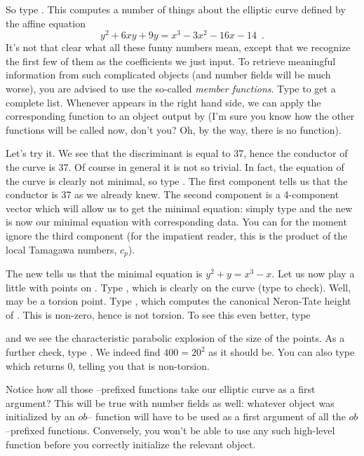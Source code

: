 So type . This computes a number of things
about the elliptic curve defined by the affine equation
%
$$ y^2+6xy+9y = x^3-3x^2-16x-14\enspace. $$
%
It's not that clear what all these funny numbers mean, except that we
recognize the first few of them as the coefficients we just input. To
retrieve meaningful information from such complicated objects (and number
fields will be much worse), you are advised to use the so-called {\it member
functions}. Type  to get a complete list. Whenever  appears
in the right hand side, we can apply the corresponding function to an object
output by  (I'm sure you know how the other  functions
will be called now, don't you? Oh, by the way, there is no 
function).

  Let's try it. We see that the discriminant  is equal to 37,
hence the conductor of the curve is 37. Of course in general it is not so
trivial. In fact, the equation of the curve is clearly not minimal, so type
. The first component  tells us that the
conductor is 37 as we already knew. The second component is a 4-component
vector which will allow us to get the minimal equation: simply type
 and the new  is now our minimal
equation with corresponding data. You can for the moment ignore the third
component  (for the impatient reader, this is the product of the
local Tamagawa numbers, $c_p$).

The new  tells us that the minimal equation is $y^2+y = x^3-x$.
Let us now play a little with points on . Type , which is
clearly on the curve (type  to check). Well, 
may be a torsion point. Type , which computes the
canonical Neron-Tate height of . This is non-zero, hence  is
not torsion. To see this even better, type


\noindent and we see the characteristic parabolic explosion of the size of
the points. As a further check, type
. We indeed find
$400=20^2$ as it should be. You can also type  which
returns 0, telling you that  is non-torsion.

Notice how all those --prefixed functions take our elliptic curve as
a first argument? This will be true with number fields as well: whatever
object was initialized by an $ob$-- function will have to be used as
a first argument of all the $ob$--prefixed functions. Conversely, you won't be
able to use any such high-level function before you correctly initialize the
relevant object. \smallskip

